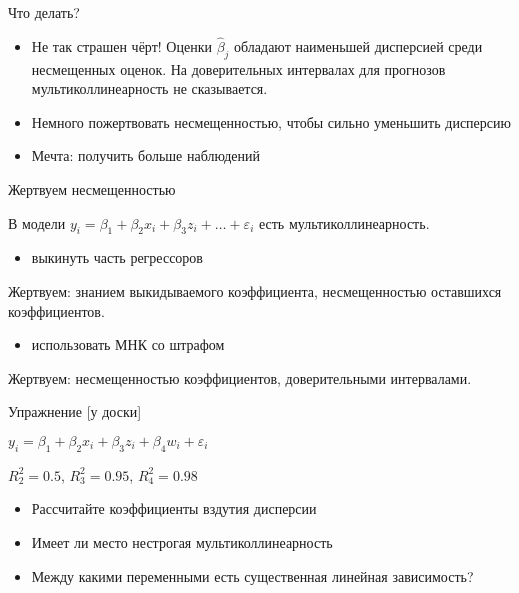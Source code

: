 \documentclass[ignorenonframetext,]{beamer}
\newcommand{\e}{\varepsilon}
\begin{document}
\begin{frame}{Что делать?}

\begin{itemize}
\itemsep1pt\parskip0pt
\item
  Не так страшен чёрт! Оценки \(\hat{\beta}_j\) обладают наименьшей
  дисперсией среди несмещенных оценок. На доверительных интервалах для
  прогнозов мультиколлинеарность не сказывается.
\item
  Немного пожертвовать несмещенностью, чтобы сильно уменьшить дисперсию
\item
  Мечта: получить больше наблюдений
\end{itemize}

\end{frame}

\begin{frame}{Жертвуем несмещенностью}

В модели \(y_i=\beta_1 + \beta_2 x_i +\beta_3 z_i + \ldots + \e_i\) есть
мультиколлинеарность.

\begin{itemize}
\itemsep1pt\parskip0pt
\item
  выкинуть часть регрессоров
\end{itemize}

Жертвуем: знанием выкидываемого коэффициента, несмещенностью оставшихся
коэффициентов.

\begin{itemize}
\itemsep1pt\parskip0pt
\item
  использовать МНК со штрафом
\end{itemize}

Жертвуем: несмещенностью коэффициентов, доверительными интервалами.

\end{frame}

\begin{frame}{Упражнение {[}у доски{]}}

\(y_i=\beta_1 + \beta_2 x_i + \beta_3 z_i + \beta_4 w_i + \e_i\)

\(R^2_2=0.5\), \(R^2_3=0.95\), \(R^2_4=0.98\)

\begin{itemize}
\itemsep1pt\parskip0pt
\item
  Рассчитайте коэффициенты вздутия дисперсии
\item
  Имеет ли место нестрогая мультиколлинеарность
\item
  Между какими переменными есть существенная линейная зависимость?
\end{itemize}

\end{frame}
\end{document}
